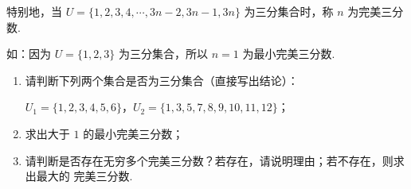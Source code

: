 \documentclass[a4paper,11pt]{article}
\begin{document}
\begin{enumerate}
特别地，当 $U=\{1,2,3,4,\cdots,3n-2,3n-1,3n\}$ 为三分集合时，称 $n$ 为完美三分数.

如：因为 $U=\{1,2,3\}$ 为三分集合，所以 $n=1$ 为最小完美三分数.

\begin{enumerate}[label=(\arabic*)]

\item 请判断下列两个集合是否为三分集合（直接写出结论）：

$U_1=\{1,2,3,4,5,6\}$，$U_2=\{1,3,5,7,8,9,10,11,12\}$；

\item 求出大于 $1$ 的最小完美三分数；

\item 请判断是否存在无穷多个完美三分数？若存在，请说明理由；若不存在，则求出最大的
完美三分数.

\end{enumerate}



\end{enumerate}
\end{document}
